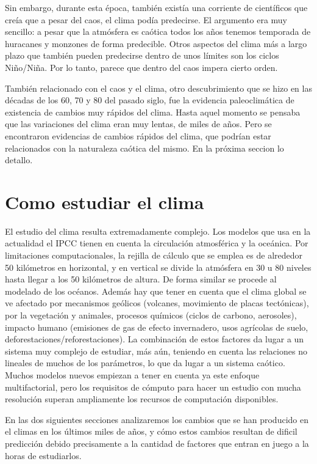 \documentclass[
  11pt,
  a4paper,
  DIV=11,
  numbers=noendperiod]{scrreprt}
\begin{document}
Sin embargo, durante esta época, también existía una corriente de
científicos que creía que a pesar del caos, el clima podía predecirse.
El argumento era muy sencillo: a pesar que la atmósfera es caótica todos
los años tenemos temporada de huracanes y monzones de forma predecible.
Otros aspectos del clima más a largo plazo que también pueden predecirse
dentro de unos límites son los ciclos Niño/Niña. Por lo tanto, parece
que dentro del caos impera cierto orden.

También relacionado con el caos y el clima, otro descubrimiento que se
hizo en las décadas de los 60, 70 y 80 del pasado siglo, fue la
evidencia paleoclimática de existencia de cambios muy rápidos del clima.
Hasta aquel momento se pensaba que las variaciones del clima eran muy
lentas, de miles de años. Pero se encontraron evidencias de cambios
rápidos del clima, que podrían estar relacionados con la naturaleza
caótica del mismo. En la próxima seccion lo detallo.

\section{Como estudiar el clima}\label{como-estudiar-el-clima}

El estudio del clima resulta extremadamente complejo. Los modelos que
usa en la actualidad el IPCC tienen en cuenta la circulación atmosférica
y la oceánica. Por limitaciones computacionales, la rejilla de cálculo
que se emplea es de alrededor 50 kilómetros en horizontal, y en vertical
se divide la atmósfera en 30 u 80 niveles hasta llegar a los 50
kilómetros de altura. De forma similar se procede al modelado de los
océanos. Además hay que tener en cuenta que el clima global se ve
afectado por mecanismos geólicos (volcanes, movimiento de placas
tectónicas), por la vegetación y animales, procesos químicos (ciclos de
carbono, aerosoles), impacto humano (emisiones de gas de efecto
invernadero, usos agrícolas de suelo, deforestaciones/reforestaciones).
La combinación de estos factores da lugar a un sistema muy complejo de
estudiar, más aún, teniendo en cuenta las relaciones no lineales de
muchos de los parámetros, lo que da lugar a un sistema caótico. Muchos
modelos nuevos empiezan a tener en cuenta ya este enfoque
multifactorial, pero los requisitos de cómputo para hacer un estudio con
mucha resolución superan ampliamente los recursos de computación
disponibles.

En las dos siguientes secciones analizaremos los cambios que se han
producido en el climas en los últimos miles de años, y cómo estos
cambios resultan de dificil predicción debido precisamente a la cantidad
de factores que entran en juego a la horas de estudiarlos.
\end{document}
